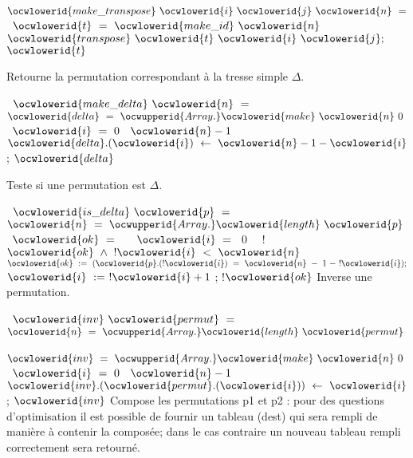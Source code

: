 \documentclass[12pt]{article}
\begin{document}
\ocweol
\label{Permutation.ml:781}%
\medskip
\ocwbegincode{}\ocwindent{0.00em}
~$\ocwlowerid{make\_transpose}~\ocwlowerid{i}~\ocwlowerid{j}~\ocwlowerid{n}~=$\ocweol
\ocwindent{2.00em}
~$\ocwlowerid{t}~=~\ocwlowerid{make\_id}~\ocwlowerid{n}~$\ocweol
\ocwindent{2.00em}
$\ocwlowerid{transpose}~\ocwlowerid{t}~\ocwlowerid{i}~\ocwlowerid{j};$\ocweol
\ocwindent{2.00em}
$\ocwlowerid{t}$\medskip

\ocwendcode{}\ocwindent{0.00em}
Retourne la permutation correspondant à la tresse
   simple $\Delta$.

\ocweol
\label{Permutation.ml:940}%
\medskip
\ocwbegincode{}\ocwindent{0.00em}
~$\ocwlowerid{make\_delta}~\ocwlowerid{n}~=$\ocweol
\ocwindent{2.00em}
~$\ocwlowerid{delta}~=~\ocwupperid{Array.}\ocwlowerid{make}~\ocwlowerid{n}~0~$\ocweol
\ocwindent{2.00em}
~$\ocwlowerid{i}~=~0~$~$\ocwlowerid{n}-1~$\ocweol
\ocwindent{4.00em}
$\ocwlowerid{delta}.(\ocwlowerid{i})~\leftarrow{}~\ocwlowerid{n}-1-\ocwlowerid{i}$\ocweol
\ocwindent{2.00em}
;\ocweol
\ocwindent{2.00em}
$\ocwlowerid{delta}$\medskip

\ocwendcode{}\ocwindent{0.00em}
Teste si une permutation est $\Delta$.

\ocweol
\label{Permutation.ml:1112}%
\medskip
\ocwbegincode{}\ocwindent{0.00em}
~$\ocwlowerid{is\_delta}~\ocwlowerid{p}~=$\ocweol
\ocwindent{1.00em}
~$\ocwlowerid{n}~=~\ocwupperid{Array.}\ocwlowerid{length}~\ocwlowerid{p}~$\ocweol
\ocwindent{1.00em}
~$\ocwlowerid{ok}~=~$~~~$\ocwlowerid{i}~=~$~0~\ocweol
\ocwindent{1.00em}
~!$\ocwlowerid{ok}~\land{}~!\ocwlowerid{i}~<~\ocwlowerid{n}~$\ocweol
\ocwindent{2.00em}
$\ocwlowerid{ok}~:=~(\ocwlowerid{p}.(!\ocwlowerid{i})~=~\ocwlowerid{n}~-~1~-~!\ocwlowerid{i});$\ocweol
\ocwindent{2.00em}
$\ocwlowerid{i}~:=~!\ocwlowerid{i}+1$\ocweol
\ocwindent{1.00em}
;\ocweol
\ocwindent{1.00em}
!$\ocwlowerid{ok}$\ocweol
\ocwendcode{}\allowbreak\ocwsection
\label{Permutation.ml:1285}%
Inverse une permutation.

\ocweol
\label{Permutation.ml:1315}%
\medskip
\ocwbegincode{}\ocwindent{0.00em}
~$\ocwlowerid{inv}~\ocwlowerid{permut}~=$\ocweol
\ocwindent{2.00em}
~$\ocwlowerid{n}~=~\ocwupperid{Array.}\ocwlowerid{length}~\ocwlowerid{permut}~$\ocweol
\ocwindent{2.00em}
~$\ocwlowerid{inv}~=~\ocwupperid{Array.}\ocwlowerid{make}~\ocwlowerid{n}~0~$\ocweol
\ocwindent{2.00em}
~$\ocwlowerid{i}~=~0~$~$\ocwlowerid{n}-1~$\ocweol
\ocwindent{4.00em}
$\ocwlowerid{inv}.(\ocwlowerid{permut}.(\ocwlowerid{i}))~\leftarrow{}~\ocwlowerid{i}$\ocweol
\ocwindent{2.00em}
;\ocweol
\ocwindent{2.00em}
$\ocwlowerid{inv}$\ocweol
\ocwendcode{}\allowbreak\ocwsection
\label{Permutation.ml:1476}%
Compose les permutations p1 et p2 : pour des questions
   d'optimisation il est possible de fournir un tableau (dest)
   qui sera rempli de manière à contenir la composée; dans le cas
   contraire un nouveau tableau rempli correctement sera retourné.
\end{document}

